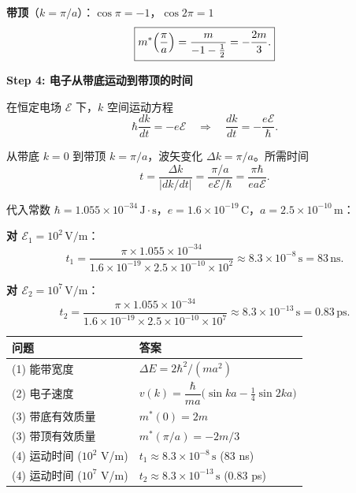 \begin{derivationbox}[标准解题过程]
\textbf{带顶}（$k=\pi/a$）：$\cos\pi=-1$，$\cos2\pi=1$
\begin{equation}
\boxed{m^*\Bigl(\frac{\pi}{a}\Bigr)=\frac{m}{-1-\frac{1}{2}}=-\frac{2m}{3}.}
\end{equation}

\textbf{Step 4: 电子从带底运动到带顶的时间}

在恒定电场 $\mathcal{E}$ 下，$k$ 空间运动方程
\begin{equation}
\hbar\frac{dk}{dt}=-e\mathcal{E}
\quad\Longrightarrow\quad
\frac{dk}{dt}=-\frac{e\mathcal{E}}{\hbar}.
\end{equation}

从带底 $k=0$ 到带顶 $k=\pi/a$，波矢变化 $\Delta k=\pi/a$。所需时间
\begin{equation}
t=\frac{\Delta k}{|dk/dt|}=\frac{\pi/a}{e\mathcal{E}/\hbar}=\frac{\pi\hbar}{ea\mathcal{E}}.
\end{equation}

代入常数 $\hbar=1.055\times10^{-34}\,\text{J}\cdot\text{s}$，$e=1.6\times10^{-19}\,\text{C}$，$a=2.5\times10^{-10}\,\text{m}$：

\textbf{对 $\mathcal{E}_1=10^2\,\text{V/m}$}：
\begin{equation}
\boxed{t_1=\frac{\pi\times1.055\times10^{-34}}{1.6\times10^{-19}\times2.5\times10^{-10}\times10^2}\approx8.3\times10^{-8}\,\text{s}=83\,\text{ns}.}
\end{equation}

\textbf{对 $\mathcal{E}_2=10^7\,\text{V/m}$}：
\begin{equation}
\boxed{t_2=\frac{\pi\times1.055\times10^{-34}}{1.6\times10^{-19}\times2.5\times10^{-10}\times10^7}\approx8.3\times10^{-13}\,\text{s}=0.83\,\text{ps}.}
\end{equation}
\end{derivationbox}

\begin{formulabox}[答案汇总]
\begin{center}
\begin{tabular}{ll}
\toprule
\textbf{问题} & \textbf{答案} \\
\midrule
(1) 能带宽度 & $\Delta E=2\hbar^2/(ma^2)$ \\
(2) 电子速度 & $v(k)=\dfrac{\hbar}{ma}\bigl(\sin ka-\frac{1}{4}\sin 2ka\bigr)$ \\
(3) 带底有效质量 & $m^*(0)=2m$ \\
(3) 带顶有效质量 & $m^*(\pi/a)=-2m/3$ \\
(4) 运动时间 ($10^2$ V/m) & $t_1\approx8.3\times10^{-8}\,\text{s}$ (83 ns) \\
(4) 运动时间 ($10^7$ V/m) & $t_2\approx8.3\times10^{-13}\,\text{s}$ (0.83 ps) \\
\bottomrule
\end{tabular}
\end{center}
\end{formulabox}

